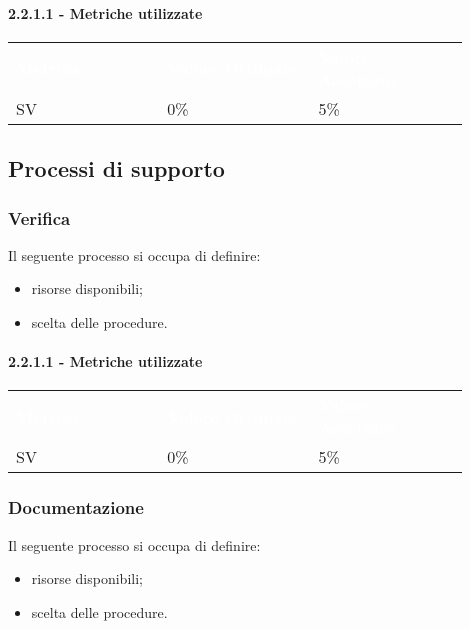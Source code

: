 {{\paragraph{2.2.1.1 - Metriche utilizzate}
{\renewcommand{\arraystretch}{1.5}
\begin{longtable}{p{0.30\linewidth}p{0.30\linewidth}p{0.30\linewidth}}
	\rowcolor[RGB]{33, 73, 50}
	\textcolor{white}{\textbf{Metrica}} & \textcolor{white}{\textbf{Valore Ottimale}} & \textcolor{white}{\textbf{Valore Accettato}}\\
    \rowcolor[RGB]{216, 235, 171}
    SV & 0\% & 5\%\\
\end{longtable}

\subsection{Processi di supporto}

\subsubsection{Verifica}
Il seguente processo si occupa di definire:
\begin{itemize}
    \item risorse disponibili;
    \item scelta delle procedure.
\end{itemize}
\paragraph{2.2.1.1 - Metriche utilizzate}
{\renewcommand{\arraystretch}{1.5}
\begin{longtable}{p{0.30\linewidth}p{0.30\linewidth}p{0.30\linewidth}}
	\rowcolor[RGB]{33, 73, 50}
	\textcolor{white}{\textbf{Metrica}} & \textcolor{white}{\textbf{Valore Ottimale}} & \textcolor{white}{\textbf{Valore Accettato}}\\
    \rowcolor[RGB]{216, 235, 171}
    SV & 0\% & 5\%\\
\end{longtable}

\subsubsection{Documentazione}
Il seguente processo si occupa di definire:
\begin{itemize}
    \item risorse disponibili;
    \item scelta delle procedure.
\end{itemize}
}}}}
